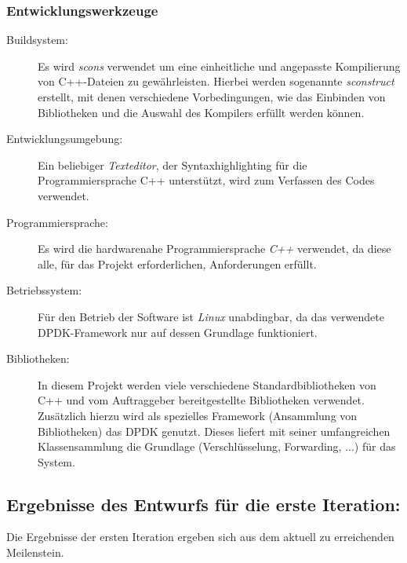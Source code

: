 \subsubsection{Entwicklungswerkzeuge}
	\begin{description}
		\item[Buildsystem:] Es wird \textit{scons} verwendet um eine einheitliche und angepasste Kompilierung von C++-Dateien zu gewährleisten. 
		Hierbei werden sogenannte \textit{sconstruct} erstellt, mit denen verschiedene Vorbedingungen, wie das Einbinden von Bibliotheken und die Auswahl des Kompilers erfüllt werden können.
		
		\item[Entwicklungsumgebung:] Ein beliebiger \textit{Texteditor}, der Syntaxhighlighting für die Programmiersprache C++ unterstützt, wird zum Verfassen des Codes verwendet.
		
		\item[Programmiersprache:] Es wird die hardwarenahe Programmiersprache \textit{C++} verwendet, da diese alle, für das Projekt erforderlichen, Anforderungen erfüllt.
		
		\item[Betriebssystem:] Für den Betrieb der Software ist \textit{Linux} unabdingbar, da das verwendete DPDK-Framework nur auf dessen Grundlage funktioniert.
		
		\item[Bibliotheken:] In diesem Projekt werden viele verschiedene Standardbibliotheken von C++ und vom Auftraggeber bereitgestellte Bibliotheken verwendet. 
		Zusätzlich hierzu wird als spezielles Framework (Ansammlung von Bibliotheken) das DPDK genutzt. 
		Dieses liefert mit seiner umfangreichen Klassensammlung die Grundlage (Verschlüsselung, Forwarding, ...) für das System. 
		
	\end{description}

\subsection{Ergebnisse des Entwurfs für die erste Iteration:}
Die Ergebnisse der ersten Iteration ergeben sich aus dem aktuell zu erreichenden Meilenstein.

